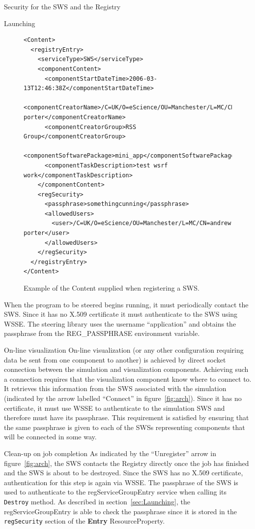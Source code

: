 \documentclass[a4paper]{article}
\begin{document}
\begin{section}{Security for the SWS and the Registry}
\begin{subsection}{Launching}
\begin{figure}
\begin{verbatim}
<Content>
  <registryEntry>
    <serviceType>SWS</serviceType>
    <componentContent>
      <componentStartDateTime>2006-03-13T12:46:38Z</componentStartDateTime>
      <componentCreatorName>/C=UK/O=eScience/OU=Manchester/L=MC/CN=andrew porter</componentCreatorName>
      <componentCreatorGroup>RSS Group</componentCreatorGroup>
      <componentSoftwarePackage>mini_app</componentSoftwarePackage>
      <componentTaskDescription>test wsrf work</componentTaskDescription>
    </componentContent>
    <regSecurity>
      <passphrase>somethingcunning</passphrase>
      <allowedUsers>
        <user>/C=UK/O=eScience/OU=Manchester/L=MC/CN=andrew porter</user>
      </allowedUsers>
    </regSecurity>
  </registryEntry>
</Content>
\end{verbatim}
\caption{Example of the Content supplied when registering a SWS.}
\label{fig:contentXML}
\end{figure}
When the program to be steered begins running, it must periodically contact the SWS.
Since it has no X.509 certificate it must authenticate to the SWS using WSSE.  The
steering library uses the username ``application'' and obtains the 
passphrase from the REG\_PASSPHRASE environment variable.
\end{subsection}


\begin{subsection}{On-line visualization}
On-line visualization (or any other configuration requiring data be sent from one
component to another) is achieved by direct socket connection between the 
simulation and visualization components.  Achieving such a connection requires
that the visualization component know where to connect to.  It retrieves this
information from the SWS associated with the simulation (indicated by the arrow labelled ``Connect'' in figure~\ref{fig:arch}).  Since it has no
certificate, it must use WSSE to authenticate to the simulation SWS and therefore
must have its passphrase.  This requirement is satisfied by ensuring that the same 
passphrase is given to each of the SWSs representing components that will be 
connected in some way.
\end{subsection} 

\begin{subsection}{Clean-up on job completion}
As indicated by the ``Unregister'' arrow in figure~\ref{fig:arch}, the SWS contacts
the Registry directly once the job has finished and the SWS is about to be destroyed.
Since the SWS has no X.509 certificate, authentication for this step is again via
WSSE.  The passphrase of the SWS is used to authenticate to the regServiceGroupEntry
service when calling its \texttt{Destroy} method.  As described in 
section~\ref{sec:Launching}, the
regServiceGroupEntry is able to check the passphrase since it is stored in the
\texttt{regSecurity} section of the {\bf Entry} ResourceProperty.
\end{subsection}

\end{section}
\end{document}
